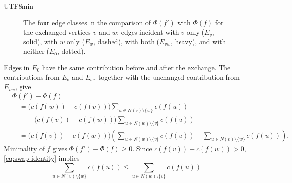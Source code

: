 \documentclass[reqno]{amsart}
\theoremstyle{definition}
\numberwithin{equation}{section}
\begin{document}
\begin{CJK*}{UTF8}{min}
\begin{figure}[ht]
  \centering
  \caption{The four edge classes in the comparison of \(\Phi(f')\) with
  \(\Phi(f)\) for the exchanged vertices \(v\) and \(w\): edges incident with
  \(v\) only (\(E_v\), solid), with \(w\) only (\(E_w\), dashed), with both
  (\(E_{vw}\), heavy), and with neither (\(E_0\), dotted).}
  \label{fig:edge-classes}
\end{figure}

Edges in \(E_0\) have the same contribution before and after the exchange. The
contributions from \(E_v\) and \(E_w\), together with the unchanged contribution
from \(E_{vw}\), give
\begin{equation}
  \begin{aligned}
  &\Phi(f')-\Phi(f)\\
    &\quad={}\bigl(c(f(w))-c(f(v))\bigr)
      \sum_{u\in N(v)\setminus\{w\}}c(f(u))\\
    &\qquad+\bigl(c(f(v))-c(f(w))\bigr)
      \sum_{u\in N(w)\setminus\{v\}}c(f(u))\\
    &\quad=\bigl(c(f(v))-c(f(w))\bigr)
      \left(
        \sum_{u\in N(w)\setminus\{v\}}c(f(u))
        -\sum_{u\in N(v)\setminus\{w\}}c(f(u))
      \right).
  \end{aligned}
  \label{eq:swap-identity}
\end{equation}
Minimality of \(f\) gives \(\Phi(f')-\Phi(f)\geq0\). Since
\(c(f(v))-c(f(w))>0\), \eqref{eq:swap-identity} implies
\begin{equation}
  \sum_{u\in N(v)\setminus\{w\}}c(f(u))
  \leq
  \sum_{u\in N(w)\setminus\{v\}}c(f(u)).
  \label{eq:neighbour-sums-except}
\end{equation}


\end{CJK*}
\end{document}
